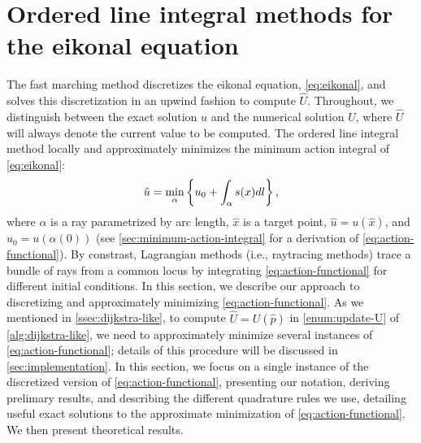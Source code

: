 \documentclass[sisc-eikonal.tex]{subfiles}
\begin{document}
\section{Ordered line integral methods for the eikonal equation}

The fast marching method discretizes the eikonal equation,
\cref{eq:eikonal}, and solves this discretization in an upwind fashion
to compute $\hat{U}$. Throughout, we distinguish between the exact
solution $u$ and the numerical solution $U$, where $\hat{U}$ will
always denote the current value to be computed. The ordered line
integral method locally and approximately minimizes the minimum action
integral of \cref{eq:eikonal}:
\begin{equation}
  \label{eq:action-functional}
  \hat{u} = \min_{\alpha} \set{u_0 + \int_\alpha s(x) dl},
\end{equation}
where $\alpha$ is a ray parametrized by arc length, $\hat{x}$ is a
target point, $\hat{u} = u(\hat{x})$, and $u_0 = u(\alpha(0))$ (see
\cref{sec:minimum-action-integral} for a derivation of
\cref{eq:action-functional}). By constrast, Lagrangian methods (i.e.,
raytracing methods) trace a bundle of rays from a common locus by
integrating \cref{eq:action-functional} for different initial
conditions. In this section, we describe our approach to discretizing
and approximately minimizing \cref{eq:action-functional}. As we
mentioned in \cref{ssec:dijkstra-like}, to compute
$\hat{U} = U(\hat{p})$ in \cref{enum:update-U} of
\cref{alg:dijkstra-like}, we need to approximately minimize several
instances of \cref{eq:action-functional}; details of this procedure
will be discussed in \cref{sec:implementation}. In this section, we
focus on a single instance of the discretized version of
\cref{eq:action-functional}, presenting our notation, deriving
prelimary results, and describing the different quadrature rules we
use, detailing useful exact solutions to the approximate minimization
of \cref{eq:action-functional}. We then present theoretical results.
\end{document}
